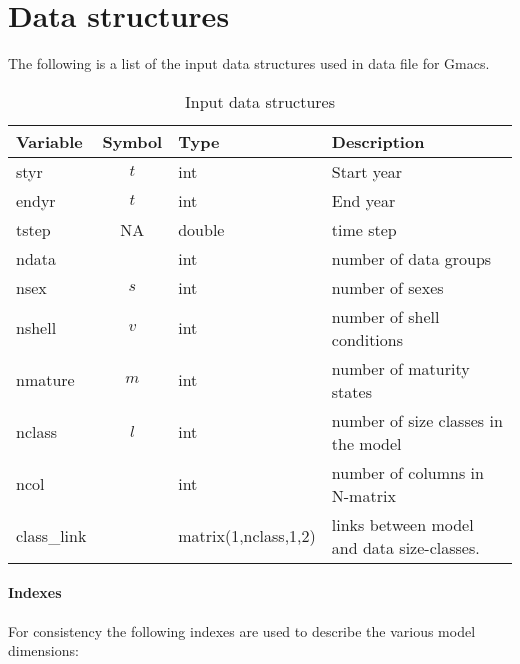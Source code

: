 \section{Data structures}
The following is a list of the input data structures used in data file for Gmacs.

\begin{table}[!tbh]
	\caption{Input data structures}\label{Tab:inputDataStructures}
	\begin{tabular}{lcll}
	\hline
	Variable & Symbol & Type & Description \\
	\hline
	styr & $t$      & int  & Start year  \\
	endyr & $t$     & int  & End year    \\
	tstep & NA    & double & time step \\
	ndata &  &  int        & number of data groups \\
	nsex  & $s$   & int    & number of sexes \\
	nshell & $v$  & int    & number of shell conditions\\
	nmature & $m$ & int    & number of maturity states \\
	nclass & $l$ & int & number of size classes in the model\\
	ncol & & int & number of columns in N-matrix \\


	class\_link & & matrix(1,nclass,1,2)&links between model and data size-classes.\\
	\hline         
	\end{tabular}
\end{table}


\paragraph{Indexes}
For consistency the following indexes are used to describe the various model dimensions:

